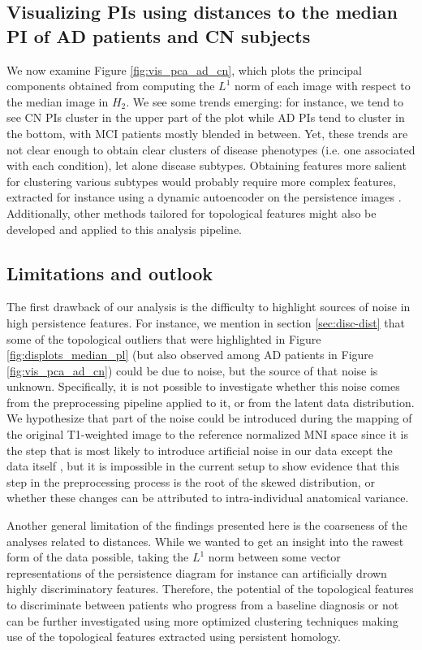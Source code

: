 \documentclass{article}
\begin{document}
\subsection{Visualizing PIs using distances to the median PI of AD patients and CN subjects}

We now examine Figure \ref{fig:vis_pca_ad_cn}, which plots the principal components obtained from
computing the $L^1$ norm of each image with respect to the median image in $H_2$. We see some trends
emerging: for instance, we tend to see CN PIs cluster in the upper part of the plot while AD PIs
tend to cluster in the bottom, with MCI patients mostly blended in between. Yet, these trends are
not clear enough to obtain clear clusters of disease phenotypes (i.e. one associated with each
condition), let alone disease subtypes. Obtaining features more salient for clustering various
subtypes would probably require more complex features, extracted for instance using a dynamic
autoencoder on the persistence images \citep{mrabah2019deep}. Additionally, other methods tailored
for topological features might also be developed and applied to this analysis pipeline.

\subsection{Limitations and outlook}

The first drawback of our analysis is the difficulty to highlight sources of noise in high
persistence features. For instance, we mention in section \ref{sec:disc-dist} that some of the
topological outliers that were highlighted in Figure \ref{fig:displots_median_pl} (but also observed
among AD patients in Figure \ref{fig:vis_pca_ad_cn}) could be due to noise, but the source of that
noise is unknown. Specifically, it is not possible to investigate whether this noise comes from the
preprocessing pipeline applied to it, or from the latent data distribution. We hypothesize that part
of the noise could be introduced during the mapping of the original T1-weighted image to the
reference normalized MNI space since it is the step that is most likely to introduce artificial
noise in our data except the data itself \citep{collins19943d}, but it is impossible in the
current setup to show evidence that this step in the preprocessing process is the root of the skewed
distribution, or whether these changes can be attributed to intra-individual anatomical variance.

Another general limitation of the findings presented here is the coarseness of the analyses related
to distances. While we wanted to get an insight into the rawest form of the data possible, taking
the $L^1$ norm between some vector representations of the persistence diagram for instance can
artificially drown highly discriminatory features. Therefore, the potential of the topological
features to discriminate between patients who progress from a baseline diagnosis or not can be
further investigated using more optimized clustering techniques making use of the topological
features extracted using persistent homology.
\end{document}
